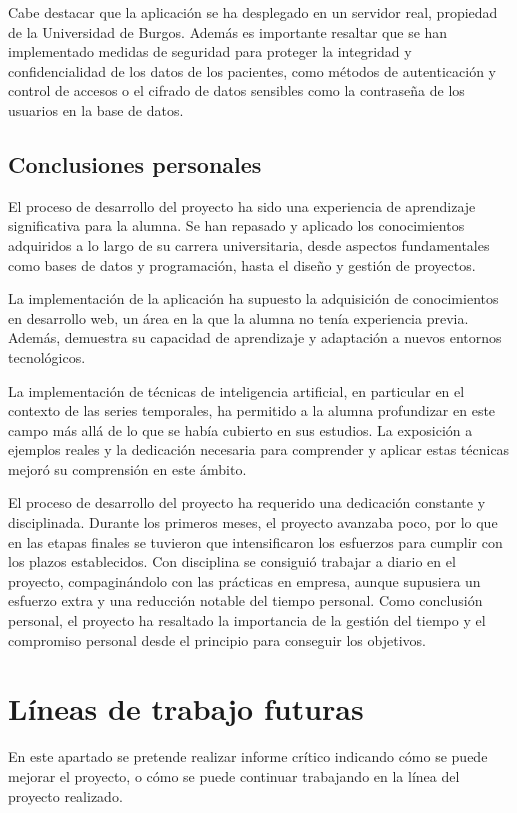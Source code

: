 Cabe destacar que la aplicación se ha desplegado en un servidor real, propiedad de la Universidad de Burgos.
Además es importante resaltar que se han implementado medidas de seguridad para proteger la integridad y confidencialidad de los datos de los pacientes, como métodos de autenticación y control de accesos o el cifrado de datos sensibles como la contraseña de los usuarios en la base de datos.


\subsection{Conclusiones personales}
El proceso de desarrollo del proyecto ha sido una experiencia de aprendizaje significativa para la alumna. Se han repasado y aplicado los conocimientos adquiridos a lo largo de su carrera universitaria, desde aspectos fundamentales como bases de datos y programación, hasta el diseño y gestión de proyectos.

La implementación de la aplicación ha supuesto la adquisición de conocimientos en desarrollo web, un área en la que la alumna no tenía experiencia previa. Además, demuestra su capacidad de aprendizaje y adaptación a nuevos entornos tecnológicos.

La implementación de técnicas de inteligencia artificial, en particular en el contexto de las series temporales, ha permitido a la alumna profundizar en este campo más allá de lo que se había cubierto en sus estudios. La exposición a ejemplos reales y la dedicación necesaria para comprender y aplicar estas técnicas mejoró su comprensión en este ámbito.

El proceso de desarrollo del proyecto ha requerido una dedicación constante y disciplinada. Durante los primeros meses, el proyecto avanzaba poco, por lo que en las etapas finales se tuvieron que intensificaron los esfuerzos para cumplir con los plazos establecidos. Con disciplina se consiguió trabajar a diario en el proyecto, compaginándolo con las prácticas en empresa, aunque supusiera un esfuerzo extra y una reducción notable del tiempo personal. Como conclusión personal, el proyecto ha resaltado la importancia de la gestión del tiempo y el compromiso personal desde el principio para conseguir los objetivos.





\section{Líneas de trabajo futuras}
En este apartado se pretende realizar informe crítico indicando cómo se puede mejorar el proyecto, o cómo se puede continuar trabajando en la línea del proyecto realizado. 


